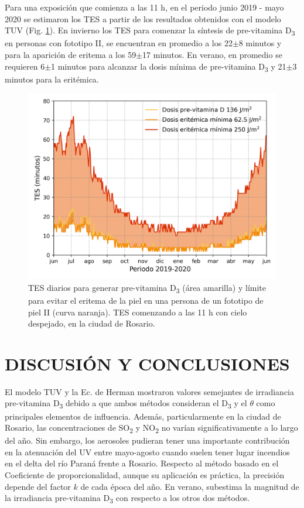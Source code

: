 \documentclass[10pt,twocolumn]{article}
\begin{document}
Para una exposición que comienza a las 11 h, en el periodo junio 2019 - mayo 2020 se estimaron los TES a partir de los resultados obtenidos con el modelo TUV (Fig. \ref{fig:TES}). En invierno los TES para comenzar la síntesis de pre-vitamina D\textsubscript{3} en personas con fototipo II, se encuentran en promedio a los 22$\pm$8 minutos y para la aparición de eritema a los 59$\pm$17 minutos. En verano, en promedio se requieren 6$\pm$1 minutos para alcanzar la dosis mínima de pre-vitamina D\textsubscript{3} y 21$\pm$3 minutos para la eritémica.

\begin{figure}[ht]
  \centering
  \includegraphics[scale=0.47]{dosis_vitamin.png}
  \caption{TES diarios para generar pre-vitamina D\textsubscript{3} (área amarilla) y límite para evitar el eritema de la piel en una persona de un fototipo de piel II (curva naranja). TES comenzando a las 11 h con cielo despejado, en la ciudad de Rosario.}
  \label{fig:TES}
\end{figure}

\section{DISCUSIÓN Y CONCLUSIONES}
El modelo TUV y la Ec. de Herman mostraron valores semejantes de irradiancia pre-vitamina D\textsubscript{3} debido a que ambos métodos consideran el D\textsubscript{3} y el $\theta$ como principales elementos de influencia. Además, particularmente en la ciudad de Rosario, las concentraciones de SO\textsubscript{2} y NO\textsubscript{2} no varían significativamente a lo largo del año. Sin embargo, los aerosoles pudieran tener una importante contribución en la atenuación del UV entre mayo-agosto cuando suelen tener lugar incendios en el delta del río Paraná frente a Rosario.\cite{Madronich1987} Respecto al método basado en el Coeficiente de proporcionalidad, aunque su aplicación es práctica, la precisión depende del factor $k$ de cada época del año. En verano, subestima la magnitud de la irradiancia pre-vitamina D\textsubscript{3} con respecto a los otros dos métodos.
\end{document}
